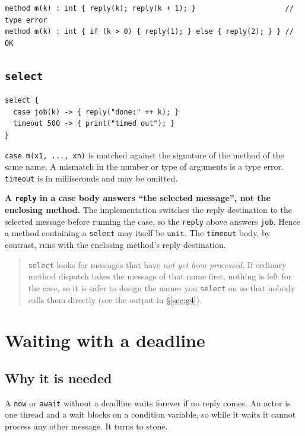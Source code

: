 \documentclass[11pt,a4paper]{article}
\newcommand{\ty}[1]{\ensuremath{\mathtt{#1}}}
\begin{document}
\begin{lstlisting}
method m(k) : int { reply(k); reply(k + 1); }                     // type error
method m(k) : int { if (k > 0) { reply(1); } else { reply(2); } } // OK
\end{lstlisting}

\subsection{\texttt{select}}

\begin{lstlisting}
select {
  case job(k) -> { reply("done:" ++ k); }
  timeout 500 -> { print("timed out"); }
}
\end{lstlisting}

\texttt{case m(x1, ..., xn)} is matched against the signature of the method of
the same name. A mismatch in the number or type of arguments is a type error.
\texttt{timeout} is in milliseconds and may be omitted.

\textbf{A \texttt{reply} in a case body answers ``the selected message'', not
the enclosing method.} The implementation switches the reply destination to the
selected message before running the case, so the \texttt{reply} above answers
\texttt{job}. Hence a method containing a \texttt{select} may itself be
\ty{unit}. The \texttt{timeout} body, by contrast, runs with the enclosing
method's reply destination.

\begin{quote}\small
\texttt{select} looks for messages that have \emph{not yet been processed}. If
ordinary method dispatch takes the message of that name first, nothing is left
for the case, so it is safer to design the names you \texttt{select} on so that
nobody calls them directly (see the output in \S\ref{sec:g4}).
\end{quote}

\section{Waiting with a deadline}
\label{sec:deadline}

\subsection{Why it is needed}

A \texttt{now} or \texttt{await} without a deadline waits forever if no reply
comes. An actor is one thread and a wait blocks on a condition variable, so
while it waits it cannot process any other message. It turns to stone.
\end{document}
